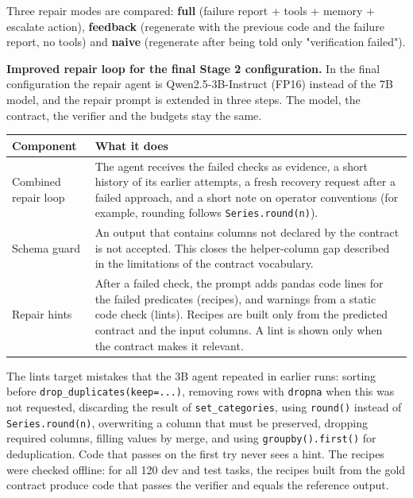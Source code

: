 \documentclass[11pt]{article}
\begin{document}
Three repair modes are compared: \textbf{full} (failure report + tools +
memory + escalate action), \textbf{feedback} (regenerate with the
previous code and the failure report, no tools) and \textbf{naive}
(regenerate after being told only "verification failed").

\textbf{Improved repair loop for the final Stage 2 configuration.} In
the final configuration the repair agent is Qwen2.5-3B-Instruct (FP16)
instead of the 7B model, and the repair prompt is extended in three
steps. The model, the contract, the verifier and the budgets stay the
same.

\begin{table}[!tp]
\centering\footnotesize\setlength{\tabcolsep}{3pt}\renewcommand{\arraystretch}{1.1}
\begin{tabularx}{\textwidth}{l>{\raggedright\arraybackslash}X}
\toprule
\textbf{Component} & \textbf{What it does} \\
\midrule
Combined repair loop & The agent receives the failed checks as evidence, a short history of its earlier attempts, a fresh recovery request after a failed approach, and a short note on operator conventions (for example, rounding follows \texttt{Series.\allowbreak{}round(n)}). \\
Schema guard & An output that contains columns not declared by the contract is not accepted. This closes the helper-column gap described in the limitations of the contract vocabulary. \\
Repair hints & After a failed check, the prompt adds pandas code lines for the failed predicates (recipes), and warnings from a static code check (lints). Recipes are built only from the predicted contract and the input columns. A lint is shown only when the contract makes it relevant. \\
\bottomrule
\end{tabularx}
\end{table}

The lints target mistakes that the 3B agent repeated in earlier runs:
sorting before
\texttt{drop\_\allowbreak{}duplicates(keep=.\allowbreak{}.\allowbreak{}.\allowbreak{})},
removing rows with \texttt{dropna} when this was not requested,
discarding the result of \texttt{set\_\allowbreak{}categories}, using
\texttt{round()} instead of \texttt{Series.\allowbreak{}round(n)},
overwriting a column that must be preserved, dropping required columns,
filling values by merge, and using
\texttt{groupby().\allowbreak{}first()} for deduplication. Code that
passes on the first try never sees a hint. The recipes were checked
offline: for all 120 dev and test tasks, the recipes built from the gold
contract produce code that passes the verifier and equals the reference
output.
\end{document}
